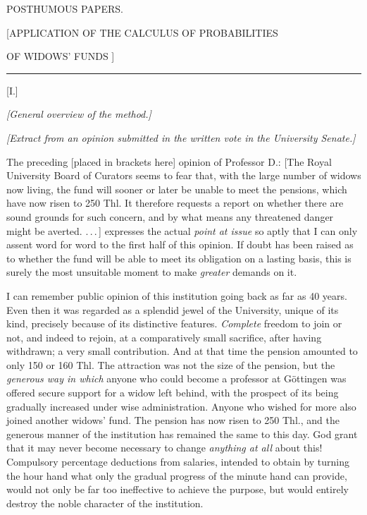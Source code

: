 \clearpage
{}
\begin{center}
{\Large POSTHUMOUS PAPERS.\par}\bigskip
{\large [APPLICATION OF THE CALCULUS OF PROBABILITIES\par}
\medskip
{\large OF WIDOWS' FUNDS ]\par}
\medskip\rule{.15\linewidth}{.3pt}\par\bigskip
{\large [I.]\par}
\textit{[General overview of the method.]}\par
\textit{[Extract from an opinion submitted in the written vote in the University Senate.]}\par
\end{center}
The preceding [placed in brackets here] opinion of Professor D.: [The Royal University Board of Curators seems to fear that, with the large number of widows now living, the fund will sooner or later be unable to meet the pensions, which have now risen to 250 Thl. It therefore requests a report on whether there are sound grounds for such concern, and by what means any threatened danger might be averted. .\,.\,.\,] expresses the actual \textit{point at issue} so aptly that I can only assent word for word to the first half of this opinion. If doubt has been raised as to whether the fund will be able to meet its obligation on a lasting basis, this is surely the most unsuitable moment to make \textit{greater} demands on it.

\indent I can remember public opinion of this institution going back as far as 40 years. Even then it was regarded as a splendid jewel of the University, unique of its kind, precisely because of its distinctive features. \textit{Complete} freedom to join or not, and indeed to rejoin, at a comparatively small sacrifice, after having withdrawn; a very small contribution. And at that time the pension amounted to only 150 or 160 Thl. The attraction was not the size of the pension, but the \textit{generous way in which} anyone who could become a professor at Göttingen was offered secure support for a widow left behind, with the prospect of its being gradually increased under wise administration. Anyone who wished for more also joined another widows' fund. The pension has now risen to 250 Thl., and the generous manner of the institution has remained the same to this day. God grant that it may never become necessary to change \textit{anything at all} about this! Compulsory percentage deductions from salaries, intended to obtain by turning the hour hand what only the gradual progress of the minute hand can provide, would not only be far too ineffective to achieve the purpose, but would entirely destroy the noble character of the institution.

